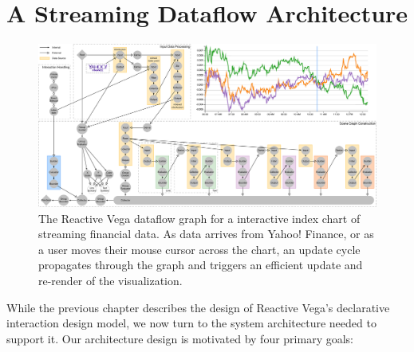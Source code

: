 \graphicspath{{./vega-arch/figures/}}
\chapter{A Streaming Dataflow Architecture}
\label{sec:vg:arch}

\begin{figure}[h!]
  \vspace{-40pt}
  \centering
  \includegraphics[width=\columnwidth]{teaser}
  \caption{The Reactive Vega dataflow graph for a interactive index chart of
  streaming financial data. As data arrives from Yahoo! Finance, or as a user
  moves their mouse cursor across the chart, an update cycle propagates through
  the graph and triggers an efficient update and re-render of the
  visualization.}
  \label{fig:vg:teaser}
\end{figure}

While the previous chapter describes the design of Reactive Vega's declarative
interaction design model, we now turn to the system architecture needed to
support it. Our architecture design is motivated by four primary goals:

